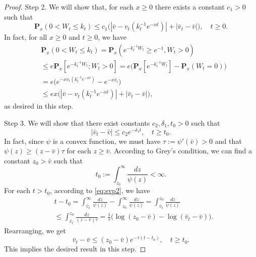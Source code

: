 \documentclass[12pt,a4paper]{amsart}
\theoremstyle{plain}
\theoremstyle{definition}
\numberwithin{equation}{section}
\begin{document}
\begin{proof}
    Step 2. We will show that, for each $x \geq 0$ there exists a constant
    $c_1>0$ such that
\[
    \mathbf P_{x}(0< W_t\leq k_t)
     \leq c_1\big(|\bar v- v_t(k_t^{-1}e^{-\alpha t})|+|\bar v_t - \bar v|\big),
    \quad t\geq 0.
\]
    In fact, for all $x\geq 0$ and $t\geq 0$, we have
\begin{align}
    &\mathbf P_{x}(0<W_t \leq k_t)
    = \mathbf P_{x}( e^{-k_t^{-1}W_t}\geq e^{-1},W_t > 0)
    \\&\leq e \mathbf P_{x}[e^{-k_t^{-1} W_t};W_t > 0]
    =  e\big(\mathbf P_x[e^{-k_t^{-1} W_t}]-\mathbf P_x(W_t = 0)\big)
    \\ &= e\big(e^{-xv_t(k_t^{-1} e^{-\alpha t})}-e^{-x\bar v_t}\big)
    \\&\leq ex \big(|\bar v-v_t(k_t^{-1} e^{-\alpha t})|+ |\bar v_t- \bar v|\big),
\end{align}
    as desired in this step.

    Step 3. We will show that there exist constants
    $c_2, \delta_1, t_0 > 0$ such that
\[
    |\bar v_t-\bar v|
    \leq c_2e^{-\delta_1 t},    \quad t\geq t_0.
\]
        In fact, since $\psi$ is a convex function, we must have $\tau:=\psi'(\bar v)>0$ and that  $\psi(z) \geq (z-\bar v)\tau$ for each $z\geq \bar v$.
    According to Grey's condition, we can find a constant $z_0 >\bar v $ such that
\[
   t_0
    := \int^\infty_{z_0} \frac{dz}{\psi(z)} < \infty.
\]
For each $t > t_0$, according to \eqref{eq:svp2}, we have
\begin{align}
    &t-t_0 =
    \int^\infty_{\bar v_t} \frac{dz}{\psi(z)} - \int_{z_0}^\infty \frac{dz}{\psi(z)}
    =\int_{\bar v_t}^{z_0} \frac{dz}{\psi(z)}
    \\ &\leq \int_{\bar v_t}^{z_0} \frac{dz}{(z-\bar v)\tau}
    = \frac{1}{\tau} \big(\log (z_0-\bar v) - \log(\bar v_t-\bar v)\big).
\end{align}
    Rearranging, we get
\[
    \bar v_t - \bar v \leq (z_0 - \bar v)e^{-\tau(t-t_0)},
    \quad t\geq t_0.
\]
    This implies the desired result in this step.


\end{proof}
\end{document}
